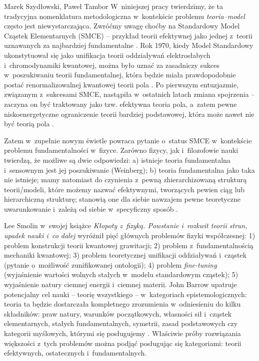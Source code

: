 \begin{artplenv2auth}{Marek Szydłowski, Paweł Tambor}
W~niniejszej pracy twierdzimy, że ta tradycyjna nomenklatura metodologiczna w~kontekście problemu \textit{teoria–model} często jest niewystarczająca. Zwróćmy uwagę choćby na Standardowy Model Cząstek Elementarnych (SMCE) -- przykład teorii efektywnej jako jednej z~teorii uznawanych za najbardziej fundamentalne
\parencite[][]{kaplan_effective_1999}. %
 Rok 1970, kiedy Model Standardowy ukonstytuował się jako unifikacja teorii oddziaływań elektrosłabych i~chromodynamiki kwantowej, można było uznać za zasadniczy sukces w~poszukiwaniu teorii fundamentalnej, która będzie miała prawdopodobnie postać renormalizowalnej kwantowej teorii pola 
\parencite[][]{weinberg_newtonianism_1987}. %
 Po pierwszym entuzjazmie, związanym z~sukcesami SMCE, nastąpiła w~ostatnich latach zmiana spojrzenia -- zaczyna on być traktowany jako tzw. efektywna teoria pola, a~zatem pewne niskoenergetyczne ograniczenie teorii bardziej podstawowej, która może nawet nie być teorią pola 
\parencites[][]{hartmann_effective_2001}[por.][]{weinberg_what_1997}.%


Zatem w~zupełnie nowym świetle powraca pytanie o~status SMCE w~kontekście problemu fundamentalności w~fizyce. Zarówno fizycy, jak i~filozofowie nauki twierdzą, że możliwe są dwie odpowiedzi: a) istnieje teoria fundamentalna i~sensownym jest jej poszukiwanie (Weinberg); b) teoria fundamentalna jako taka nie istnieje; mamy natomiast do czynienia z~pewną zhierarchizowaną strukturą teorii/modeli, które możemy nazwać efektywnymi, tworzących pewien ciąg lub hierarchiczną strukturę; stanowią one dla siebie nawzajem pewne teoretyczne uwarunkowanie i~zależą od siebie w~specyficzny sposób
\parencite[][]{cao_conceptual_1993}.%


Lee Smolin w~swojej książce \textit{Kłopoty z~fizyką. Powstanie i~rozkwit teorii strun, upadek nauki i~co dalej}
\parencite*[][]{smolin_klopoty_2008}
wyróżnił pięć głównych problemów fizyki współczesnej: 1) problem konstrukcji teorii kwantowej grawitacji; 2) problem z~fundamentalnością mechaniki kwantowej; 3) problem teoretycznej unifikacji oddziaływań i~cząstek (pytanie o~możliwość zunifikowanej ontologii); 4) problem \textit{fine-tuning} (wyjaśnienie wartości wolnych stałych w~modelu standardowym cząstek); 5) wyjaśnienie natury ciemnej energii i~ciemnej materii.
 John Barrow upatruje potencjalny cel nauki -- teorię wszystkiego -- w~kategoriach epistemologicznych: teoria ta będzie dostarczała kompletnego zrozumienia w~odniesieniu do kilku składników: praw natury, warunków początkowych, własności sił i~cząstek elementarnych, stałych fundamentalnych, symetrii, zasad podstawowych czy kategorii myślowych, którymi się posługujemy 
\parencite[][s.~4]{barrow_new_2007}. %
 Właściwie próby rozwiązania większości z~tych problemów można podjąć posługując się kategoriami: teorii efektywnych, ostatecznych i~fundamentalnych.


\end{artplenv2auth}
